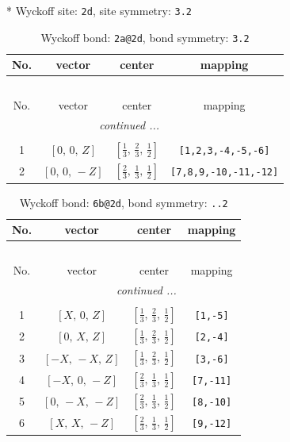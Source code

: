 \documentclass[fleqn,8pt]{jsarticle}
\begin{document}
* Wyckoff site: {\tt 2d}, site symmetry: {\tt 3.2}
\renewcommand{\arraystretch}{1.2}
\begin{longtable}{cccc}
\caption{Wyckoff bond: {\tt 2a@2d}, bond symmetry: {\tt 3.2}}
 \\
 \hline \hline
No. & vector & center & mapping \\ \hline \endfirsthead

\multicolumn{3}{l}{\tablename\ \thetable{}} \\
 \hline \hline
No. & vector & center & mapping \\ \hline \endhead

 \hline \hline
\multicolumn{3}{r}{\footnotesize\it continued ...} \\ \endfoot

 \hline \hline
\multicolumn{3}{r}{} \\ \endlastfoot

1 & $\left[ 0,\, 0,\, Z \right]$ & $\left[ \frac{1}{3},\, \frac{2}{3},\, \frac{1}{2} \right]$ & {\tt [1,2,3,-4,-5,-6]} \\ \hline
2 & $\left[ 0,\, 0,\, - Z \right]$ & $\left[ \frac{2}{3},\, \frac{1}{3},\, \frac{1}{2} \right]$ & {\tt [7,8,9,-10,-11,-12]} \\
\end{longtable}
\renewcommand{\arraystretch}{1.2}
\begin{longtable}{cccc}
\caption{Wyckoff bond: {\tt 6b@2d}, bond symmetry: {\tt ..2}}
 \\
 \hline \hline
No. & vector & center & mapping \\ \hline \endfirsthead

\multicolumn{3}{l}{\tablename\ \thetable{}} \\
 \hline \hline
No. & vector & center & mapping \\ \hline \endhead

 \hline \hline
\multicolumn{3}{r}{\footnotesize\it continued ...} \\ \endfoot

 \hline \hline
\multicolumn{3}{r}{} \\ \endlastfoot

1 & $\left[ X,\, 0,\, Z \right]$ & $\left[ \frac{1}{3},\, \frac{2}{3},\, \frac{1}{2} \right]$ & {\tt [1,-5]} \\ \hline
2 & $\left[ 0,\, X,\, Z \right]$ & $\left[ \frac{1}{3},\, \frac{2}{3},\, \frac{1}{2} \right]$ & {\tt [2,-4]} \\ \hline
3 & $\left[ - X,\, - X,\, Z \right]$ & $\left[ \frac{1}{3},\, \frac{2}{3},\, \frac{1}{2} \right]$ & {\tt [3,-6]} \\ \hline
4 & $\left[ - X,\, 0,\, - Z \right]$ & $\left[ \frac{2}{3},\, \frac{1}{3},\, \frac{1}{2} \right]$ & {\tt [7,-11]} \\ \hline
5 & $\left[ 0,\, - X,\, - Z \right]$ & $\left[ \frac{2}{3},\, \frac{1}{3},\, \frac{1}{2} \right]$ & {\tt [8,-10]} \\ \hline
6 & $\left[ X,\, X,\, - Z \right]$ & $\left[ \frac{2}{3},\, \frac{1}{3},\, \frac{1}{2} \right]$ & {\tt [9,-12]} \\
\end{longtable}
\end{document}
